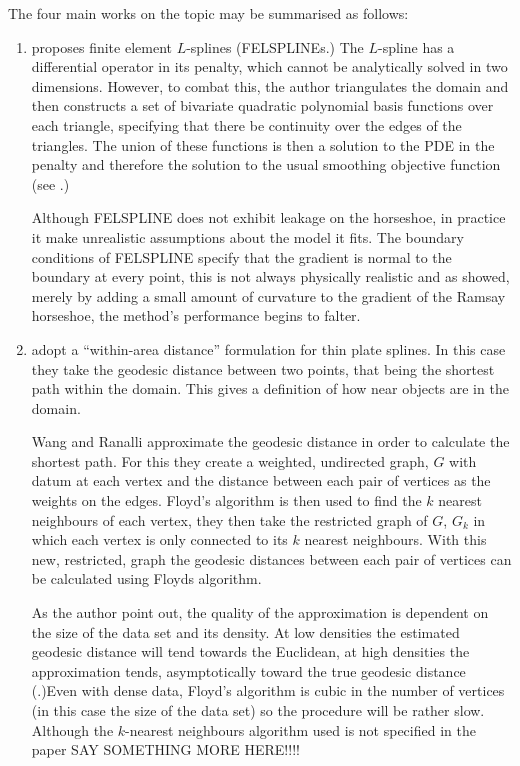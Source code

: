 The four main works on the topic may be summarised as follows:

\begin{enumerate}
\item \cite{ramsay} proposes finite element $L$-splines (FELSPLINEs.) The $L$-spline has a differential operator in its penalty, which cannot be analytically solved in two dimensions. However, to combat this, the author triangulates the domain and then constructs a set of bivariate quadratic polynomial basis functions over each triangle, specifying that there be continuity over the edges of the triangles. The union of these functions is then a solution to the PDE in the penalty and therefore the solution to the usual smoothing objective function (see .)

Although FELSPLINE does not exhibit leakage on the horseshoe, in practice it make unrealistic assumptions about the model it fits. The boundary conditions of FELSPLINE specify that the gradient is normal to the boundary at every point, this is not always physically realistic and as \cite{soap} showed, merely by adding a small amount of curvature to the gradient of the Ramsay horseshoe, the method's performance begins to falter.

\item \cite{wangranalli} adopt a ``within-area distance'' formulation for thin plate splines. In this case they take the geodesic distance between two points, that being the shortest path within the domain. This gives a definition of how near objects are in the domain.

Wang and Ranalli approximate the geodesic distance in order to calculate the shortest path. For this they create a weighted, undirected graph, $G$ with datum at each vertex and the distance between each pair of vertices as the weights on the edges. Floyd's algorithm is then used to find the $k$ nearest neighbours of each vertex, they then take the restricted graph of $G$, $G_k$ in which each vertex is only connected to its $k$ nearest neighbours. With this new, restricted, graph the geodesic distances between each pair of vertices can be calculated using Floyds algorithm.

As the author point out, the quality of the approximation is dependent on the size of the data set and its density. At low densities the estimated geodesic distance will tend towards the Euclidean, at high densities the approximation tends, asymptotically toward the true geodesic distance (\cite{bernstein}.)Even with dense data, Floyd's algorithm is cubic in the number of vertices (in this case the size of the data set) so the procedure will be rather slow. Although the $k$-nearest neighbours algorithm used is not specified in the paper SAY SOMETHING MORE HERE!!!!


\end{enumerate}
